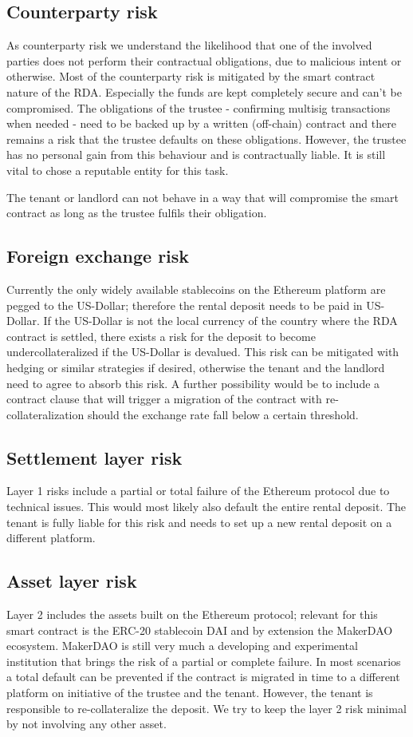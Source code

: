 \documentclass[12pt,a4paper,titlepage,oneside,english]{article}
\begin{document}
\subsection{Counterparty risk}
As counterparty risk we understand the likelihood that one of the involved parties does not perform their contractual obligations, due to malicious intent or otherwise.
Most of the counterparty risk is mitigated by the smart contract nature of the RDA. Especially the funds are kept completely secure and can't be compromised. The obligations of the trustee - confirming multisig transactions when needed - need to be backed up by a written (off-chain) contract and there remains a risk that the trustee defaults on these obligations. However, the trustee has no personal gain from this behaviour and is contractually liable. It is still vital to chose a reputable entity for this task.

The tenant or landlord can not behave in a way that will compromise the smart contract as long as the trustee fulfils their obligation.

\subsection{Foreign exchange risk}
Currently the only widely available stablecoins on the Ethereum platform are pegged to the US-Dollar; therefore the rental deposit needs to be paid in US-Dollar. If the US-Dollar is not the local currency of the country where the RDA contract is settled, there exists a risk for the deposit to become undercollateralized if the US-Dollar is devalued. This risk can be mitigated with hedging or similar strategies if desired, otherwise the tenant and the landlord need to agree to absorb this risk. A further possibility would be to include a contract clause that will trigger a migration of the contract with re-collateralization should the exchange rate fall below a certain threshold.

\subsection{Settlement layer risk}
Layer 1 risks include a partial or total failure of the Ethereum protocol due to technical issues. This would most likely also default the entire rental deposit. The tenant is fully liable for this risk and needs to set up a new rental deposit on a different platform.

\subsection{Asset layer risk}
Layer 2 includes the assets built on the Ethereum protocol; relevant for this smart contract is the ERC-20 stablecoin DAI and by extension the MakerDAO ecosystem. MakerDAO is still very much a developing and experimental institution that brings the risk of a partial or complete failure. In most scenarios a total default can be prevented if the contract is migrated in time to a different platform on initiative of the trustee and the tenant. However, the tenant is responsible to re-collateralize the deposit. We try to keep the layer 2 risk minimal by not involving any other asset.
\end{document}

